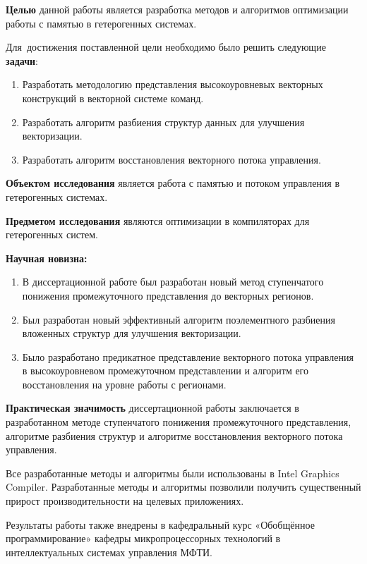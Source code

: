 \textbf{Целью} данной работы является разработка методов и алгоритмов оптимизации работы с памятью в гетерогенных системах.

Для~достижения поставленной цели необходимо было решить следующие \textbf{задачи}:
\begin{enumerate}[beginpenalty=10000] %
  \item Разработать методологию представления высокоуровневых векторных конструкций в векторной системе команд.
  \item Разработать алгоритм разбиения структур данных для улучшения векторизации.
  \item Разработать алгоритм восстановления векторного потока управления.
\end{enumerate}

\textbf{Объектом исследования} является работа с памятью и потоком управления в гетерогенных системах.

\textbf{Предметом исследования} являются оптимизации в компиляторах для гетерогенных систем.

\textbf{Научная новизна:} 
\begin{enumerate}[beginpenalty=10000]
  \item В диссертационной работе был разработан новый метод ступенчатого понижения промежуточного представления до векторных регионов.
  \item Был разработан новый эффективный алгоритм поэлементного разбиения вложенных структур для улучшения векторизации.
  \item Было разработано предикатное представление векторного потока управления в высокоуровневом промежуточном представлении и алгоритм его восстановления на уровне работы с регионами.
\end{enumerate}

\textbf{Практическая значимость} диссертационной работы заключается в разработанном методе ступенчатого понижения промежуточного представления, алгоритме разбиения структур и алгоритме восстановления векторного потока управления.

Все разработанные методы и алгоритмы были использованы в Intel Graphics Compiler. Разработанные методы и алгоритмы позволили получить существенный прирост производительности на целевых приложениях.

Результаты работы также внедрены в кафедральный курс «Обобщённое программирование» кафедры микропроцессорных технологий в интеллектуальных системах управления МФТИ.


